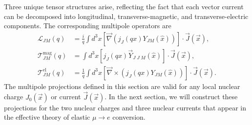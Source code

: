 \documentclass[12pt,letterpaper]{book}
\begin{document}
Three unique tensor structures arise, reflecting the fact that each vector current can be decomposed into longitudinal, transverse-magnetic, and transverse-electric components. The corresponding multipole operators are
\begin{equation}
\begin{split}
\mathcal{L}_{JM}(q)&=\frac{i}{q}\int d^3x \left[\vec{\nabla}\left(j_J(qx)Y_{JM}(\hat{x})\right)\right]\cdot\vec{J}(\vec{x}),\\
\mathcal{T}^{\mathrm{mag}}_{JM}(q)&=\int d^3x\left[j_J(qx)\vec{Y}_{J\;J\;M}(\hat{x})\right]\cdot\vec{J}(\vec{x}),\\
\mathcal{T}^{\mathrm{el}}_{JM}(q)&=\frac{1}{q}\int d^3x\left[\vec{\nabla}\times\left(j_J(qx)Y_{JM}(\hat{x})\right)\right]\cdot\vec{J}(\vec{x}).
\end{split}
\end{equation}
The multipole projections defined in this section are valid for any local nuclear charge $J_0(\vec{x})$ or current $\vec{J}(\vec{x})$. In the next section, we will construct these projections for the two nuclear charges and three nuclear currents that appear in the effective theory of elastic $\mu\rightarrow e$ conversion.

\end{document}
